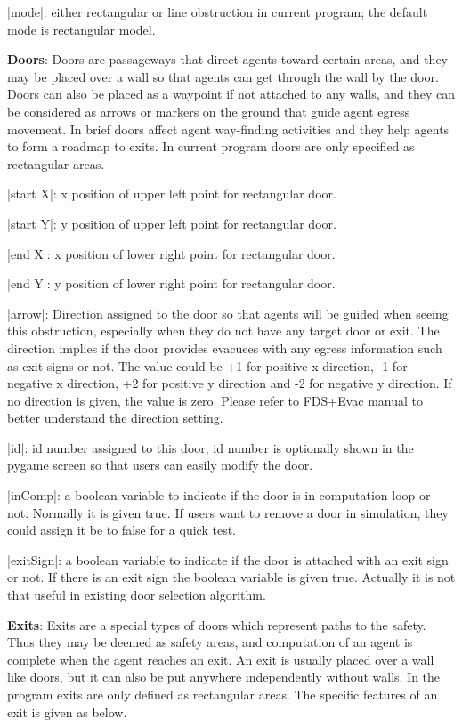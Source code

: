 \documentclass[english]{article}
\begin{document}
|mode|: either rectangular or line obstruction in current program;
the default mode is rectangular model.

\textbf{Doors}: Doors are passageways that direct agents toward certain areas, and they may be placed over a wall so that agents can get through
the wall by the door. Doors can also be placed as a waypoint if not
attached to any walls, and they can be considered as arrows or markers
on the ground that guide agent egress movement. In brief doors affect
agent way-finding activities and they help agents to form a roadmap
to exits. In current program doors are only specified as rectangular
areas.

|start X|: x position of upper left point for rectangular door.

|start Y|: y position of upper left point for rectangular door.

|end X|: x position of lower right point for rectangular door.

|end Y|: y position of lower right point for rectangular door.

|arrow|: Direction assigned to the door so that agents will be guided
when seeing this obstruction, especially when they do not have any
target door or exit. The direction implies if the door provides evacuees
with any egress information such as exit signs or not. The value could
be +1 for positive x direction, -1 for negative x direction, +2 for
positive y direction and -2 for negative y direction. If no direction
is given, the value is zero. Please refer to FDS+Evac manual to better
understand the direction setting.

|id|: id number assigned to this door; id number is optionally shown
in the pygame screen so that users can easily modify the door.

|inComp|: a boolean variable to indicate if the door is in computation
loop or not. Normally it is given true. If users want to remove a
door in simulation, they could assign it be to false for a quick test.

|exitSign|: a boolean variable to indicate if the door is attached
with an exit sign or not. If there is an exit sign the boolean variable
is given true. Actually it is not that useful in existing door selection
algorithm.

\textbf{Exits}: Exits are a special types of doors which represent
paths to the safety. Thus they may be deemed as safety areas, and
computation of an agent is complete when the agent reaches an exit.
An exit is usually placed over a wall like doors, but it can also
be put anywhere independently without walls. In the program exits
are only defined as rectangular areas. The specific features of an
exit is given as below.
\end{document}
